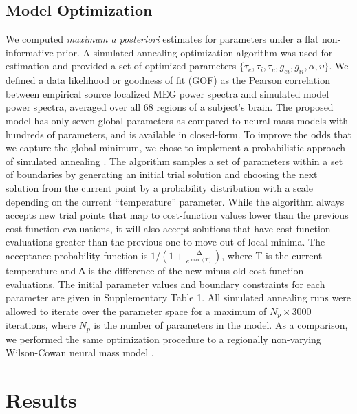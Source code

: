 \subsection{Model Optimization}
We computed \emph{maximum a posteriori} estimates for parameters under a
flat non-informative prior. A simulated annealing optimization algorithm
was used for estimation and provided a set of optimized parameters
$\{\tau_{e}, \tau_{i}, \tau_{c}, g_{ei}, g_{ii}, \alpha, \upsilon\}$.
We defined a data likelihood or goodness of fit (GOF) as the Pearson
correlation between empirical source localized MEG power spectra and
simulated model power spectra, averaged over all 68 regions of a
subject's brain. The proposed model has only seven global parameters as
compared to neural mass models with hundreds of parameters, and is
available in closed-form. To improve the odds that we capture the global
minimum, we chose to implement a probabilistic approach of simulated
annealing \cite{Kirkpatrick1983}. The algorithm samples a set of
parameters within a set of boundaries by generating an initial trial
solution and choosing the next solution from the current point by a
probability distribution with a scale depending on the current
``temperature'' parameter. While the algorithm always accepts new trial
points that map to cost-function values lower than the previous
cost-function evaluations, it will also accept solutions that have
cost-function evaluations greater than the previous one to move out of
local minima. The acceptance probability function is
$1/(1 + \frac{\mathrm{\Delta}}{e^{\max(T)}})$, where T is the current
temperature and ∆ is the difference of the new minus old cost-function
evaluations. The initial parameter values and boundary constraints for
each parameter are given in Supplementary Table 1. All simulated
annealing runs were allowed to iterate over the parameter space for a
maximum of $N_{p} \times 3000$ iterations, where $N_{p}$ is the
number of parameters in the model. As a comparison, we performed the
same optimization procedure to a regionally non-varying Wilson-Cowan
neural mass model \cite{wilson_mawilson_mathematical_1973,muldoon_stimulation-based_2016}.

\section{Results}


